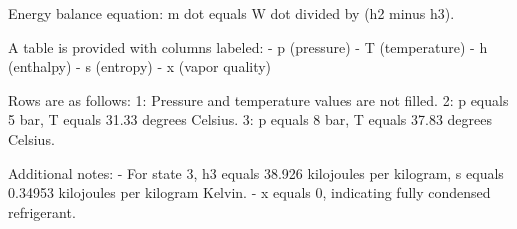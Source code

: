 Energy balance equation:  
m dot equals W dot divided by (h2 minus h3).  

A table is provided with columns labeled:  
- p (pressure)  
- T (temperature)  
- h (enthalpy)  
- s (entropy)  
- x (vapor quality)  

Rows are as follows:  
1: Pressure and temperature values are not filled.  
2: p equals 5 bar, T equals 31.33 degrees Celsius.  
3: p equals 8 bar, T equals 37.83 degrees Celsius.  

Additional notes:  
- For state 3, h3 equals 38.926 kilojoules per kilogram, s equals 0.34953 kilojoules per kilogram Kelvin.  
- x equals 0, indicating fully condensed refrigerant.